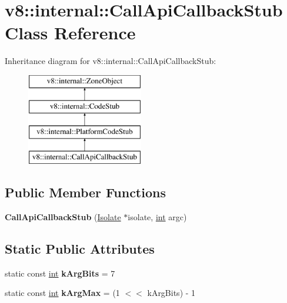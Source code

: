 \hypertarget{classv8_1_1internal_1_1CallApiCallbackStub}{}\section{v8\+:\+:internal\+:\+:Call\+Api\+Callback\+Stub Class Reference}
\label{classv8_1_1internal_1_1CallApiCallbackStub}
Inheritance diagram for v8\+:\+:internal\+:\+:Call\+Api\+Callback\+Stub\+:\begin{figure}[H]
\begin{center}
\leavevmode
\includegraphics[height=4.000000cm]{classv8_1_1internal_1_1CallApiCallbackStub}
\end{center}
\end{figure}
\subsection*{Public Member Functions}
\begin{DoxyCompactItemize}
\item 
\mbox{\label{classv8_1_1internal_1_1CallApiCallbackStub_a6632a878eba02ab92d698fdabd429f90}} 
{\bfseries Call\+Api\+Callback\+Stub} (\mbox{\hyperlink{classv8_1_1internal_1_1Isolate}{Isolate}} $\ast$isolate, \mbox{\hyperlink{classint}{int}} argc)
\end{DoxyCompactItemize}
\subsection*{Static Public Attributes}
\begin{DoxyCompactItemize}
\item 
\mbox{\label{classv8_1_1internal_1_1CallApiCallbackStub_a01bed92bdb50d4c1466364c3864b16c3}} 
static const \mbox{\hyperlink{classint}{int}} {\bfseries k\+Arg\+Bits} = 7
\item 
\mbox{\label{classv8_1_1internal_1_1CallApiCallbackStub_a1b9144f1a90fd2a03f718898bf65af2c}} 
static const \mbox{\hyperlink{classint}{int}} {\bfseries k\+Arg\+Max} = (1 $<$$<$ k\+Arg\+Bits) -\/ 1
\end{DoxyCompactItemize}
